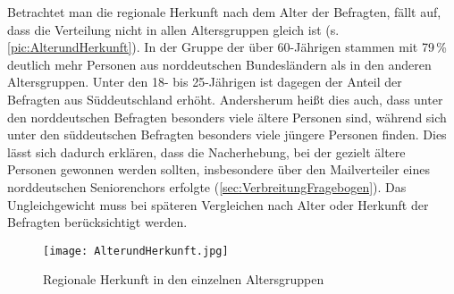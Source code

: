Betrachtet man die regionale Herkunft nach dem Alter der Befragten, fällt auf, dass die Verteilung nicht in allen Altersgruppen gleich ist (s. \autoref{pic:AlterundHerkunft}). 
In der Gruppe der über 60-Jährigen stammen mit 79\,\% deutlich mehr Personen aus norddeutschen Bundesländern als in den anderen Altersgruppen. 
Unter den 18- bis 25-Jährigen ist dagegen der Anteil der Befragten aus Süddeutschland erhöht. 
Andersherum heißt dies auch, dass unter den norddeutschen Befragten besonders viele ältere Personen sind, während sich unter den süddeutschen Befragten besonders viele jüngere Personen finden. 
Dies lässt sich dadurch erklären, dass die Nacherhebung, bei der gezielt ältere Personen gewonnen werden sollten, insbesondere über den Mailverteiler eines norddeutschen Seniorenchors erfolgte (\autoref{sec:VerbreitungFragebogen}). 
Das Ungleichgewicht muss bei späteren Vergleichen nach Alter oder Herkunft der Befragten berücksichtigt werden. 

\begin{figure}
\centering
\texttt{[image: AlterundHerkunft.jpg]}
\caption{Regionale Herkunft in den einzelnen Altersgruppen}
\label{pic:AlterundHerkunft}
\end{figure}

